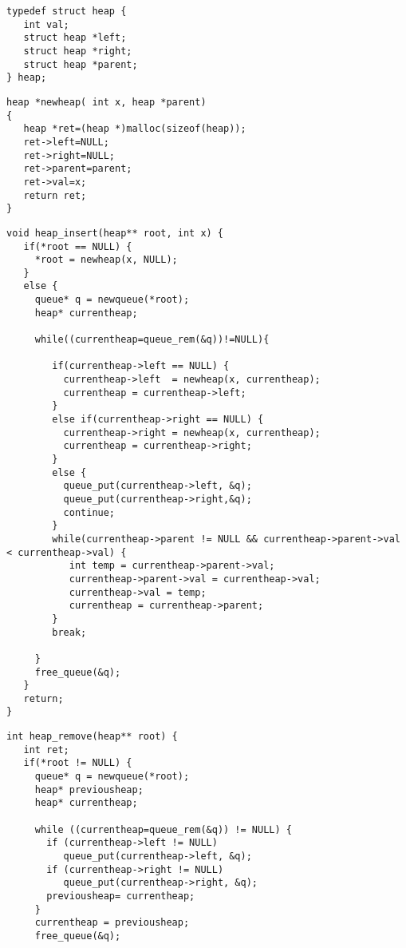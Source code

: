 \documentclass{article}[12pt]
\newenvironment{myexampleprogram}[1]{%
    \tcolorbox[beamer,%
    noparskip,breakable,
    colback=White,colframe=Goldenrod,%
    colbacklower=Yellow!75!White,%
    title=#1]}%
    {\endtcolorbox}
\begin{document}
\begin{myexampleprogram}{Programme: \texttt{Haldensortierung}}
\begin{lstlisting}
typedef struct heap {
   int val;
   struct heap *left;
   struct heap *right;
   struct heap *parent;
} heap;
\end{lstlisting}
\begin{lstlisting}
heap *newheap( int x, heap *parent)
{
   heap *ret=(heap *)malloc(sizeof(heap));
   ret->left=NULL;
   ret->right=NULL;
   ret->parent=parent;
   ret->val=x;
   return ret;
}
\end{lstlisting}
\begin{lstlisting}
void heap_insert(heap** root, int x) {
   if(*root == NULL) {
     *root = newheap(x, NULL);
   }
   else {
     queue* q = newqueue(*root);
     heap* currentheap;

     while((currentheap=queue_rem(&q))!=NULL){

        if(currentheap->left == NULL) {
          currentheap->left  = newheap(x, currentheap);
          currentheap = currentheap->left;
        }
        else if(currentheap->right == NULL) {
          currentheap->right = newheap(x, currentheap);
          currentheap = currentheap->right;
        }
        else {
          queue_put(currentheap->left, &q);
          queue_put(currentheap->right,&q);
          continue;
        }
        while(currentheap->parent != NULL && currentheap->parent->val < currentheap->val) {
           int temp = currentheap->parent->val;
           currentheap->parent->val = currentheap->val;
           currentheap->val = temp;
           currentheap = currentheap->parent;
        }
        break;

     }
     free_queue(&q);
   }
   return;
}
\end{lstlisting}
\begin{lstlisting}
int heap_remove(heap** root) {
   int ret;
   if(*root != NULL) {
     queue* q = newqueue(*root);
     heap* previousheap;
     heap* currentheap;

     while ((currentheap=queue_rem(&q)) != NULL) {
       if (currentheap->left != NULL)
          queue_put(currentheap->left, &q);
       if (currentheap->right != NULL)
          queue_put(currentheap->right, &q);
       previousheap= currentheap;
     }
     currentheap = previousheap;
     free_queue(&q);


\end{lstlisting}
\end{myexampleprogram}
\end{document}
